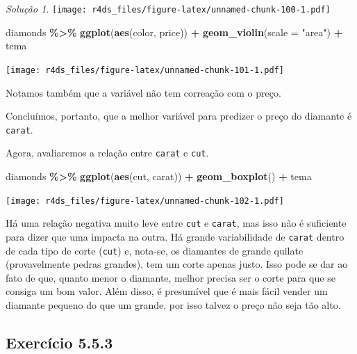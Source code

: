 \documentclass[
]{latex/krantz}
\newenvironment{Shaded}{\begin{snugshade}}{\end{snugshade}}
\newcommand{\AttributeTok}[1]{\textcolor[rgb]{0.13,0.29,0.53}{#1}}
\newcommand{\FunctionTok}[1]{\textcolor[rgb]{0.13,0.29,0.53}{\textbf{#1}}}
\newcommand{\NormalTok}[1]{#1}
\newcommand{\SpecialCharTok}[1]{\textcolor[rgb]{0.81,0.36,0.00}{\textbf{#1}}}
\newcommand{\StringTok}[1]{\textcolor[rgb]{0.31,0.60,0.02}{#1}}
\theoremstyle{definition}
\theoremstyle{definition}
\theoremstyle{definition}
\theoremstyle{definition}
\theoremstyle{remark}
\newtheorem*{solution}{Solução}
\begin{document}
\begin{solution}
\texttt{[image: r4ds\_files/figure-latex/unnamed-chunk-100-1.pdf]}

\begin{Shaded}
\begin{Highlighting}[]
\NormalTok{diamonds }\SpecialCharTok{\%\textgreater{}\%} 
    \FunctionTok{ggplot}\NormalTok{(}\FunctionTok{aes}\NormalTok{(color, price)) }\SpecialCharTok{+}
        \FunctionTok{geom\_violin}\NormalTok{(}\AttributeTok{scale =} \StringTok{"area"}\NormalTok{) }\SpecialCharTok{+}
\NormalTok{        tema}
\end{Highlighting}
\end{Shaded}

\texttt{[image: r4ds\_files/figure-latex/unnamed-chunk-101-1.pdf]}

Notamos também que a variável não tem correação com o preço.

Concluímos, portanto, que a melhor variável para predizer o preço do diamante é \texttt{carat}.

Agora, avaliaremos a relação entre \texttt{carat} e \texttt{cut}.

\begin{Shaded}
\begin{Highlighting}[]
\NormalTok{diamonds }\SpecialCharTok{\%\textgreater{}\%}
    \FunctionTok{ggplot}\NormalTok{(}\FunctionTok{aes}\NormalTok{(cut, carat)) }\SpecialCharTok{+}
        \FunctionTok{geom\_boxplot}\NormalTok{() }\SpecialCharTok{+}
\NormalTok{        tema}
\end{Highlighting}
\end{Shaded}

\texttt{[image: r4ds\_files/figure-latex/unnamed-chunk-102-1.pdf]}

Há uma relação negativa muito leve entre \texttt{cut} e \texttt{carat}, mas isso não é suficiente para dizer que uma impacta na outra. Há grande variabilidade de \texttt{carat} dentro de cada tipo de corte (\texttt{cut}) e, nota-se, os diamantes de grande quilate (provavelmente pedras grandes), tem um corte apenas justo. Isso pode se dar ao fato de que, quanto menor o diamante, melhor precisa ser o corte para que se consiga um bom valor. Além disso, é presumível que é mais fácil vender um diamante pequeno do que um grande, por isso talvez o preço não seja tão alto.
\end{solution}

\hypertarget{exr5-5-3}{%
\subsection*{Exercício 5.5.3}\label{exr5-5-3}}
\end{document}
